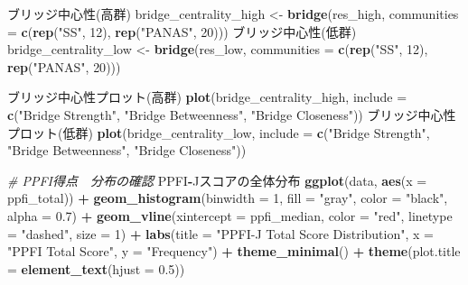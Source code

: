 \documentclass[12pt,a4paper,xelatex,ja=standard]{bxjsarticle}
\newenvironment{Shaded}{\begin{snugshade}}{\end{snugshade}}
\newcommand{\AttributeTok}[1]{\textcolor[rgb]{0.13,0.29,0.53}{#1}}
\newcommand{\CommentTok}[1]{\textcolor[rgb]{0.56,0.35,0.01}{\textit{#1}}}
\newcommand{\DecValTok}[1]{\textcolor[rgb]{0.00,0.00,0.81}{#1}}
\newcommand{\FloatTok}[1]{\textcolor[rgb]{0.00,0.00,0.81}{#1}}
\newcommand{\FunctionTok}[1]{\textcolor[rgb]{0.13,0.29,0.53}{\textbf{#1}}}
\newcommand{\NormalTok}[1]{#1}
\newcommand{\OtherTok}[1]{\textcolor[rgb]{0.56,0.35,0.01}{#1}}
\newcommand{\SpecialCharTok}[1]{\textcolor[rgb]{0.81,0.36,0.00}{\textbf{#1}}}
\newcommand{\StringTok}[1]{\textcolor[rgb]{0.31,0.60,0.02}{#1}}
\begin{document}
\begin{Shaded}
\begin{Highlighting}[]
\NormalTok{ブリッジ中心性(高群)}
\NormalTok{bridge\_centrality\_high }\OtherTok{\textless{}{-}} \FunctionTok{bridge}\NormalTok{(res\_high,}
                      \AttributeTok{communities =} \FunctionTok{c}\NormalTok{(}\FunctionTok{rep}\NormalTok{(}\StringTok{"SS"}\NormalTok{, }\DecValTok{12}\NormalTok{),}
                      \FunctionTok{rep}\NormalTok{(}\StringTok{"PANAS"}\NormalTok{, }\DecValTok{20}\NormalTok{)))}
\NormalTok{ブリッジ中心性(低群)}
\NormalTok{bridge\_centrality\_low }\OtherTok{\textless{}{-}} \FunctionTok{bridge}\NormalTok{(res\_low, }
                      \AttributeTok{communities =} \FunctionTok{c}\NormalTok{(}\FunctionTok{rep}\NormalTok{(}\StringTok{"SS"}\NormalTok{, }\DecValTok{12}\NormalTok{), }
                     　\FunctionTok{rep}\NormalTok{(}\StringTok{"PANAS"}\NormalTok{, }\DecValTok{20}\NormalTok{)))}

\NormalTok{ブリッジ中心性プロット(高群)}
\FunctionTok{plot}\NormalTok{(bridge\_centrality\_high, }
     \AttributeTok{include =} \FunctionTok{c}\NormalTok{(}\StringTok{"Bridge Strength"}\NormalTok{,}
      \StringTok{"Bridge Betweenness"}\NormalTok{, }\StringTok{"Bridge Closeness"}\NormalTok{))}
\NormalTok{ブリッジ中心性プロット(低群)}
\FunctionTok{plot}\NormalTok{(bridge\_centrality\_low, }
     \AttributeTok{include =} \FunctionTok{c}\NormalTok{(}\StringTok{"Bridge Strength"}\NormalTok{,}
    \StringTok{"Bridge Betweenness"}\NormalTok{, }\StringTok{"Bridge Closeness"}\NormalTok{))}

\CommentTok{\# PPFI得点　分布の確認}
\NormalTok{PPFI}\SpecialCharTok{{-}}\NormalTok{Jスコアの全体分布}
\FunctionTok{ggplot}\NormalTok{(data, }\FunctionTok{aes}\NormalTok{(}\AttributeTok{x =}\NormalTok{ ppfi\_total)) }\SpecialCharTok{+}
  \FunctionTok{geom\_histogram}\NormalTok{(}\AttributeTok{binwidth =} \DecValTok{1}\NormalTok{, }\AttributeTok{fill =} \StringTok{"gray"}\NormalTok{,}
              \AttributeTok{color =} \StringTok{"black"}\NormalTok{, }\AttributeTok{alpha =} \FloatTok{0.7}\NormalTok{) }\SpecialCharTok{+}
  \FunctionTok{geom\_vline}\NormalTok{(}\AttributeTok{xintercept =}\NormalTok{ ppfi\_median, }\AttributeTok{color =} \StringTok{"red"}\NormalTok{,}
             \AttributeTok{linetype =} \StringTok{"dashed"}\NormalTok{, }\AttributeTok{size =} \DecValTok{1}\NormalTok{) }\SpecialCharTok{+}
  \FunctionTok{labs}\NormalTok{(}\AttributeTok{title =} \StringTok{"PPFI{-}J Total Score Distribution"}\NormalTok{,}
       \AttributeTok{x =} \StringTok{"PPFI Total Score"}\NormalTok{,}
       \AttributeTok{y =} \StringTok{"Frequency"}\NormalTok{) }\SpecialCharTok{+}
  \FunctionTok{theme\_minimal}\NormalTok{() }\SpecialCharTok{+}
  \FunctionTok{theme}\NormalTok{(}\AttributeTok{plot.title =} \FunctionTok{element\_text}\NormalTok{(}\AttributeTok{hjust =} \FloatTok{0.5}\NormalTok{))}


\end{Highlighting}
\end{Shaded}
\end{document}
